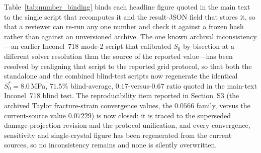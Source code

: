 \documentclass[12pt,a4paper,twocolumn]{article}
\begin{document}
Table~\ref{tab:number_binding} binds each headline figure quoted in the main text to the single script that
recomputes it and the result-JSON field that stores it, so that a reviewer can re-run any one number and
check it against a frozen hash rather than against an unversioned archive. The one known archival
inconsistency---an earlier Inconel~718 mode-2 script that calibrated $S_0$ by bisection at a different
solver resolution than the source of the reported value---has been resolved by realigning that script to
the reported grid protocol, so that both the standalone and the combined blind-test scripts now regenerate
the identical $S_0^* = 8.0$\,MPa, $71.5\%$ blind-average, $0.17$-versus-$0.67$ ratio quoted in the
main-text Inconel~718 blind test. The reproducibility item reported in
Section~S3 (the archived Taylor fracture-strain convergence values, the $0.0566$ family, versus the
current-source value $0.07229$) is now closed: it is traced to the superseded damage-projection revision and
the protocol unification, and every convergence, sensitivity and single-crystal figure has been regenerated
from the current sources, so no inconsistency remains and none is silently overwritten.
\end{document}

